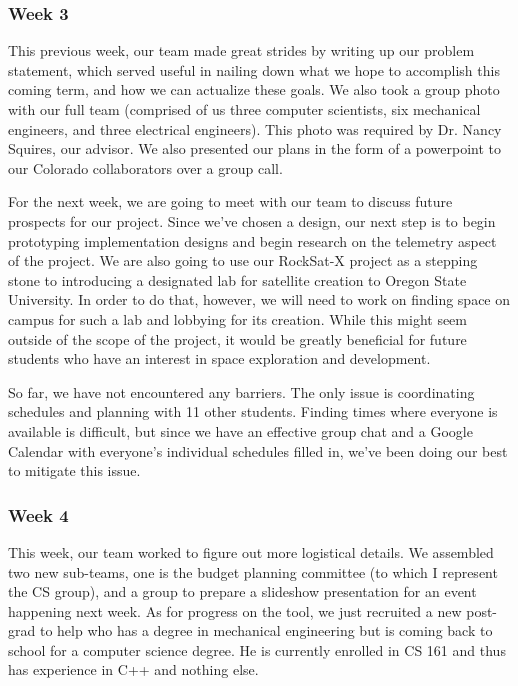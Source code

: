 \subsubsection{Week 3}
This previous week, our team made great strides by writing up our problem statement, which served useful in nailing
 down what we hope to accomplish this coming term, and how we can actualize these goals. We also took a group photo 
 with our full team (comprised of us three computer scientists, six mechanical engineers, and three electrical 
 engineers). This photo was required by Dr. Nancy Squires, our advisor. We also presented our plans in the form of a 
 powerpoint to our Colorado collaborators over a group call.

For the next week, we are going to meet with our team to discuss future prospects for our project. Since we've chosen 
a design, our next step is to begin prototyping implementation designs and begin research on the telemetry aspect of 
the project. We are also going to use our RockSat-X project as a stepping stone to introducing a designated lab for 
satellite creation to Oregon State University. In order to do that, however, we will need to work on finding space on
 campus for such a lab and lobbying for its creation. While this might seem outside of the scope of the project, it 
 would be greatly beneficial for future students who have an interest in space exploration and development.

So far, we have not encountered any barriers. The only issue is coordinating schedules and planning with 11 other 
students. Finding times where everyone is available is difficult, but since we have an effective group chat and a
 Google Calendar with everyone's individual schedules filled in, we've been doing our best to mitigate this issue.

\subsubsection{Week 4}
This week, our team worked to figure out more logistical details. We assembled two new sub-teams, one is the budget 
planning committee (to which I represent the CS group), and a group to prepare a slideshow presentation for an event 
happening next week. As for progress on the tool, we just recruited a new post-grad to help who has a degree in 
mechanical engineering but is coming back to school for a computer science degree. He is currently enrolled in CS 161 
and thus has experience in C++ and nothing else. 


